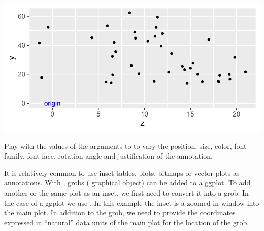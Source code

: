 \documentclass[krantz2]{krantz}\usepackage{knitr}
\begin{document}
\begin{knitrout}\footnotesize
{}\color{fgcolor}\begin{kframe}
\begin{alltt}
  \hlopt{+}
  \hlstd{()} \hlopt{+}
  \hlstd{(} \hlstd{=} \hlstd{,}
            \hlstd{=} \hlstd{,}
            \hlstd{=} \hlstd{,}  \hlstd{=} \hlstd{,}
            \hlstd{=} \hlstd{,}
           \hlstd{=}\hlstd{)}
\end{alltt}
\end{kframe}

{\centering \includegraphics[width=.7\textwidth]{figure/pos-annotate-01-1}

}



\end{knitrout}

\begin{playground}
Play with the values of the arguments to  to vary the position, size, color, font family, font face, rotation angle and justification of the annotation.
\end{playground}

It is relatively common to use inset tables, plots, bitmaps or vector plots as annotations. With , grobs ( graphical object) can be added to a ggplot. To add another or the same plot as an inset, we first need to convert it into a grob. In the case of a ggplot we use . In this example the inset is a zoomed-in window into the main plot. In addition to the grob, we need to provide the coordinates expressed in ``natural'' data units of the main plot for the location of the grob.
\end{document}
